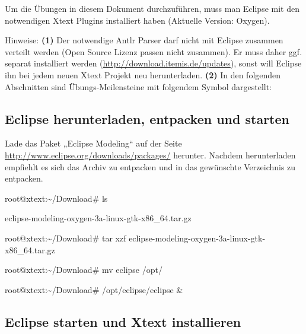 \documentclass[]{article}
\begin{document}
Um die Übungen in diesem Dokument durchzuführen, muss man Eclipse mit
den notwendigen Xtext Plugins installiert haben (Aktuelle Version:
Oxygen).

Hinweise: \textbf{(1)} Der notwendige Antlr Parser darf nicht mit
Eclipse zusammen verteilt werden (Open Source Lizenz passen nicht
zusammen). Er muss daher ggf. separat installiert werden
(\url{http://download.itemis.de/updates}), sonst will Eclipse ihn bei
jedem neuen Xtext Projekt neu herunterladen. \textbf{(2)} In den
folgenden Abschnitten sind Übungs-Meilensteine mit folgendem Symbol
dargestellt:

\subsection[Eclipse herunterladen, entpacken und
starten]{\texorpdfstring{\protect\hypertarget{anchor-15}{}{}Eclipse
herunterladen, entpacken und
starten}{Eclipse herunterladen, entpacken und starten}}\label{eclipse-herunterladen-entpacken-und-starten}

Lade das Paket „Eclipse Modeling`` auf der Seite
\url{http://www.eclipse.org/downloads/packages/} herunter. Nachdem
herunterladen empfiehlt es sich das Archiv zu entpacken und in das
gewünschte Verzeichnis zu entpacken.

root@xtext:\textasciitilde{}/Download\# ls

eclipse-modeling-oxygen-3a-linux-gtk-x86\_64.tar.gz

root@xtext:\textasciitilde{}/Download\# tar xzf
eclipse-modeling-oxygen-3a-linux-gtk-x86\_64.tar.gz

root@xtext:\textasciitilde{}/Download\# mv eclipse /opt/

root@xtext:\textasciitilde{}/Download\# /opt/eclipse/eclipse \&

\subsection[Eclipse starten und Xtext
installieren]{\texorpdfstring{\protect\hypertarget{anchor-16}{}{}Eclipse
starten und Xtext
installieren}{Eclipse starten und Xtext installieren}}\label{eclipse-starten-und-xtext-installieren}
\end{document}
